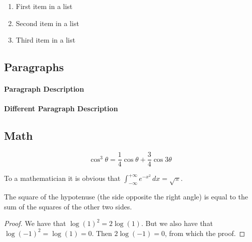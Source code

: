 \documentclass[
10pt, %
a4paper, %
oneside, %
headinclude,footinclude, %
BCOR5mm, %
]{scrartcl}
\begin{document}
\begin{enumerate}[noitemsep] %
\item First item in a list
\item Second item in a list
\item Third item in a list
\end{enumerate}


\subsection{Paragraphs}

\lipsum[6] %

\paragraph{Paragraph Description} \lipsum[7] %

\paragraph{Different Paragraph Description} \lipsum[8] %


\subsection{Math}

\lipsum[4] %

\begin{equation}
\cos^3 \theta =\frac{1}{4}\cos\theta+\frac{3}{4}\cos 3\theta
\label{eq:refname2}
\end{equation}

\lipsum[5] %

\begin{definition}[Gauss] 
To a mathematician it is obvious that
$\int_{-\infty}^{+\infty}
e^{-x^2}\,dx=\sqrt{\pi}$. 
\end{definition} 

\begin{theorem}[Pythagoras]
The square of the hypotenuse (the side opposite the right angle) is equal to the sum of the squares of the other two sides.
\end{theorem}

\begin{proof} 
We have that $\log(1)^2 = 2\log(1)$.
But we also have that $\log(-1)^2=\log(1)=0$.
Then $2\log(-1)=0$, from which the proof.
\end{proof}
\end{document}
